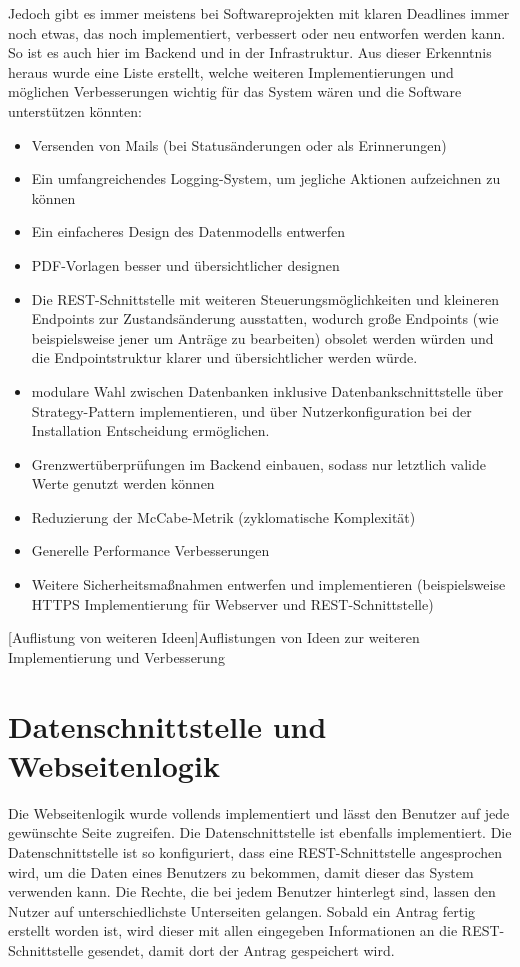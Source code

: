 Jedoch gibt es immer meistens bei Softwareprojekten mit klaren Deadlines immer noch etwas, das noch implementiert, verbessert oder neu entworfen werden kann. So ist es auch hier im Backend und in der Infrastruktur. Aus dieser Erkenntnis heraus wurde eine Liste erstellt, welche weiteren Implementierungen und möglichen Verbesserungen wichtig für das System wären und die Software unterstützen könnten:

\begin{itemize}
	\item Versenden von Mails (bei Statusänderungen oder als Erinnerungen)
	\item Ein umfangreichendes Logging-System, um jegliche Aktionen aufzeichnen zu können
	\item Ein einfacheres Design des Datenmodells entwerfen
	\item PDF-Vorlagen besser und übersichtlicher designen
	\item Die REST-Schnittstelle mit weiteren Steuerungsmöglichkeiten und kleineren Endpoints zur Zustandsänderung ausstatten, wodurch große Endpoints (wie beispielsweise jener um Anträge zu bearbeiten) obsolet werden würden und die Endpointstruktur klarer und übersichtlicher werden würde.
	\item modulare Wahl zwischen Datenbanken inklusive Datenbankschnittstelle über Strategy-Pattern implementieren, und über Nutzerkonfiguration bei der Installation Entscheidung ermöglichen.
	\item Grenzwertüberprüfungen im Backend einbauen, sodass nur letztlich valide Werte genutzt werden können
	\item Reduzierung der McCabe-Metrik (zyklomatische Komplexität)
	\item Generelle Performance Verbesserungen
	\item Weitere Sicherheitsmaßnahmen entwerfen und implementieren (beispielsweise HTTPS Implementierung für Webserver und REST-Schnittstelle)
\end{itemize}
[Auflistung von weiteren Ideen]{Auflistungen von Ideen zur weiteren Implementierung und Verbesserung}
\newpage
\section{Datenschnittstelle und Webseitenlogik}
Die Webseitenlogik wurde vollends implementiert und lässt den Benutzer auf jede gewünschte Seite zugreifen. Die Datenschnittstelle ist ebenfalls implementiert. Die Datenschnittstelle ist so konfiguriert, dass eine REST-Schnittstelle angesprochen wird, um die Daten eines Benutzers zu bekommen, damit dieser das System verwenden kann. Die Rechte, die bei jedem Benutzer hinterlegt sind, lassen den Nutzer auf unterschiedlichste Unterseiten gelangen. Sobald ein Antrag fertig erstellt worden ist, wird dieser mit allen eingegeben Informationen an die REST-Schnittstelle gesendet, damit dort der Antrag gespeichert wird.\\

